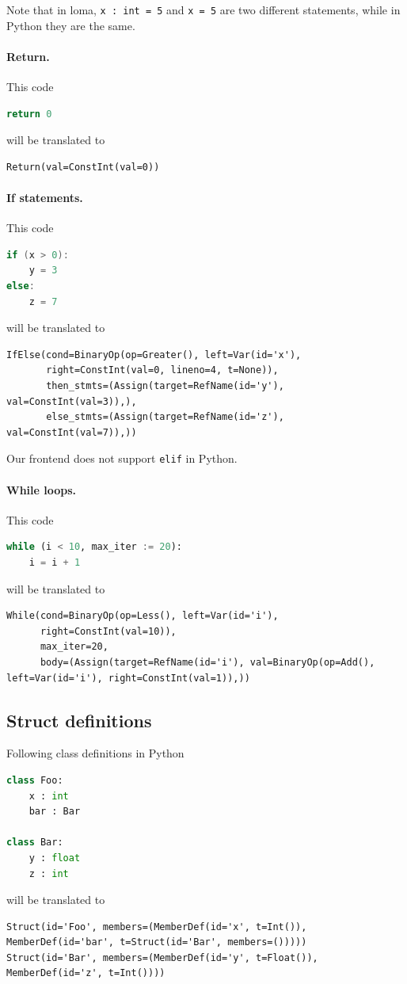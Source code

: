 Note that in loma, \lstinline{x : int = 5} and \lstinline{x = 5} are two different statements, while in Python they are the same.

\paragraph{Return.} This code
\begin{lstlisting}[language=Python]
return 0
\end{lstlisting}
will be translated to
\begin{lstlisting}
Return(val=ConstInt(val=0))
\end{lstlisting}

\paragraph{If statements.} This code
\begin{lstlisting}[language=c]
if (x > 0):
    y = 3
else:
    z = 7
\end{lstlisting}
will be translated to
\begin{lstlisting}
IfElse(cond=BinaryOp(op=Greater(), left=Var(id='x'),
       right=ConstInt(val=0, lineno=4, t=None)),
       then_stmts=(Assign(target=RefName(id='y'), val=ConstInt(val=3)),),
       else_stmts=(Assign(target=RefName(id='z'), val=ConstInt(val=7)),))
\end{lstlisting}

Our frontend does not support \lstinline{elif} in Python.

\paragraph{While loops.} This code
\begin{lstlisting}[language=python]
while (i < 10, max_iter := 20):
    i = i + 1
\end{lstlisting}
will be translated to
\begin{lstlisting}
While(cond=BinaryOp(op=Less(), left=Var(id='i'),
      right=ConstInt(val=10)),
      max_iter=20,
      body=(Assign(target=RefName(id='i'), val=BinaryOp(op=Add(), left=Var(id='i'), right=ConstInt(val=1)),))
\end{lstlisting}

\subsection{Struct definitions}
Following class definitions in Python
\begin{lstlisting}[language=Python]
class Foo:
    x : int
    bar : Bar

class Bar:
    y : float
    z : int
\end{lstlisting}
will be translated to
\begin{lstlisting}
Struct(id='Foo', members=(MemberDef(id='x', t=Int()), MemberDef(id='bar', t=Struct(id='Bar', members=()))))
Struct(id='Bar', members=(MemberDef(id='y', t=Float()), MemberDef(id='z', t=Int())))
\end{lstlisting}

